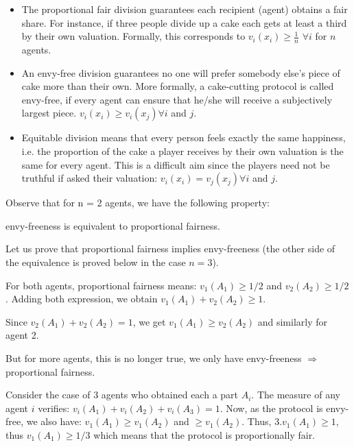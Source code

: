 \begin{itemize}
\item The proportional fair division guarantees each recipient (agent) obtains a fair share. 
For instance, if three people divide up a cake each gets at least a third by their own valuation. 
Formally, this corresponds to $v_i(x_i) \geq \frac{1}{n}$ $\forall i$ for $n$ agents.
\item An envy-free division guarantees no one will prefer somebody else's piece of cake more than their own. More formally, 
a cake-cutting protocol is called envy-free, if every agent can ensure that he/she will receive a subjectively largest piece.
 $v_i(x_i) \geq v_i(x_j) \forall i$ and $j$.
\item Equitable division means that every person feels exactly the same happiness, 
i.e. the proportion of the cake a player receives by their own valuation is the same for every agent. 
This is a difficult aim since the players need not be truthful if asked their valuation:
 $v_i(x_i) = v_j(x_j) \forall i$ and $j$.
 \end{itemize}


\bigskip

Observe that for n = 2 agents, we have the following property:

envy-freeness is equivalent to proportional fairness.

Let us prove that proportional fairness implies envy-freeness (the other side of the equivalence is proved below in the case $n=3$).

For both agents, proportional fairness means: $v_1(A_1) \geq 1/2$ and $v_2(A_2) \geq 1/2$.
Adding both expression, we obtain $v_1(A_1)+v_2(A_2) \geq 1$.

Since $v_2(A_1) + v_2(A_2) = 1$, we get 
$v_1(A_1) \geq v_2(A_2)$ and similarly for agent 2. 

\bigskip
But for more agents, this is no longer true, we only have envy-freeness $\Rightarrow$ proportional fairness.

Consider the case of $3$ agents who obtained each a part $A_i$.
The measure of any agent $i$ verifies: $v_i(A_1)+v_i(A_2)+v_i(A_3) = 1$.
Now, as the protocol is envy-free, we also have: $v_1(A_1) \geq v_1(A_2)$ and $\geq v_1(A_2)$.
Thus, $3.v_1(A_1) \geq 1$, thus $v_1(A_1) \geq 1/3$ which means that the protocol is proportionally fair. 

